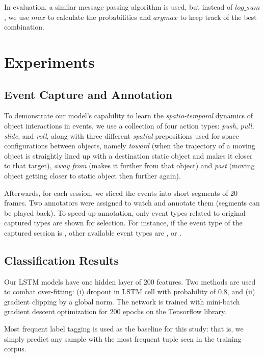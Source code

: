 \documentclass{esann}
\begin{document}
\noindent In evaluation, a similar message passing algorithm is used, but instead of $log\_sum$, we use $max$ to calculate the probabilities and $argmax$ to keep track of the best combination.

\section{Experiments}

\subsection{Event Capture and Annotation}

To demonstrate our model's capability to learn the \textit{spatio-temporal} dynamics of object interactions in events, we use a collection of four action types: \textit{push}, \textit{pull}, \textit{slide}, and \textit{roll}, along with  three different \textit{spatial} prepositions used for space configurations between objects, namely \textit{toward} (when the trajectory of a moving object is straightly lined up with a destination static object and makes it closer to that target), \textit{away from} (makes it further from that object) and \textit{past} (moving object getting closer to static object then further again).


Afterwards, for each session, we sliced the events into short segments of 20 frames. Two annotators were assigned to watch and annotate them (segments can be played back). To speed up annotation, only event types related to original captured types are shown for selection. For instance, if  the event type of the captured session is , other available event types are ,  or .  

\subsection{Classification Results}

Our LSTM models have one hidden layer of 200 features. Two methods are used to combat over-fitting: (i) dropout in LSTM cell with probability of 0.8, and (ii) gradient clipping by a global norm. The network is trained with mini-batch gradient descent optimization for 200 epochs on the Tensorflow library. 

Most frequent label tagging is used as the baseline for this study: that is, we simply predict any sample with the most frequent tuple seen in the training corpus.
\end{document}
